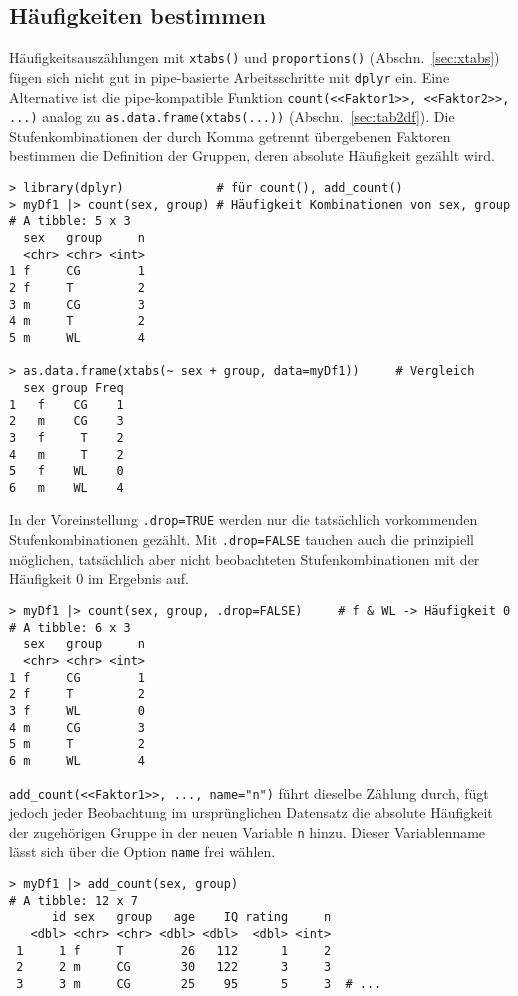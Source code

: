 \subsection{Häufigkeiten bestimmen}
\label{sec:dplyr_count}

Häufigkeitsauszählungen mit \lstinline!xtabs()! und \lstinline!proportions()! (Abschn.\ \ref{sec:xtabs}) fügen sich nicht gut in pipe-basierte Arbeitsschritte mit \lstinline!dplyr! ein. Eine Alternative ist die pipe-kompatible Funktion \lstinline!count(<<Faktor1>>, <<Faktor2>>, ...)! analog zu \lstinline!as.data.frame(xtabs(...))! (Abschn.\ \ref{sec:tab2df}). Die Stufenkombinationen der durch Komma getrennt übergebenen Faktoren bestimmen die Definition der Gruppen, deren absolute Häufigkeit gezählt wird.
\begin{lstlisting}
> library(dplyr)             # für count(), add_count()
> myDf1 |> count(sex, group) # Häufigkeit Kombinationen von sex, group
# A tibble: 5 x 3
  sex   group     n
  <chr> <chr> <int>
1 f     CG        1
2 f     T         2
3 m     CG        3
4 m     T         2
5 m     WL        4

> as.data.frame(xtabs(~ sex + group, data=myDf1))     # Vergleich
  sex group Freq
1   f    CG    1
2   m    CG    3
3   f     T    2
4   m     T    2
5   f    WL    0
6   m    WL    4
\end{lstlisting}

In der Voreinstellung \lstinline!.drop=TRUE! werden nur die tatsächlich vorkommenden Stufenkombinationen gezählt. Mit \lstinline!.drop=FALSE! tauchen auch die prinzipiell möglichen, tatsächlich aber nicht beobachteten Stufenkombinationen mit der Häufigkeit 0 im Ergebnis auf.
\begin{lstlisting}
> myDf1 |> count(sex, group, .drop=FALSE)     # f & WL -> Häufigkeit 0
# A tibble: 6 x 3
  sex   group     n
  <chr> <chr> <int>
1 f     CG        1
2 f     T         2
3 f     WL        0
4 m     CG        3
5 m     T         2
6 m     WL        4
\end{lstlisting}

\lstinline!add_count(<<Faktor1>>, ..., name="n")! führt dieselbe Zählung durch, fügt jedoch jeder Beobachtung im ursprünglichen Datensatz die absolute Häufigkeit der zugehörigen Gruppe in der neuen Variable \lstinline!n! hinzu. Dieser Variablenname lässt sich über die Option \lstinline!name! frei wählen.
\begin{lstlisting}
> myDf1 |> add_count(sex, group)
# A tibble: 12 x 7
      id sex   group   age    IQ rating     n
   <dbl> <chr> <chr> <dbl> <dbl>  <dbl> <int>
 1     1 f     T        26   112      1     2
 2     2 m     CG       30   122      3     3
 3     3 m     CG       25    95      5     3  # ...
\end{lstlisting}

